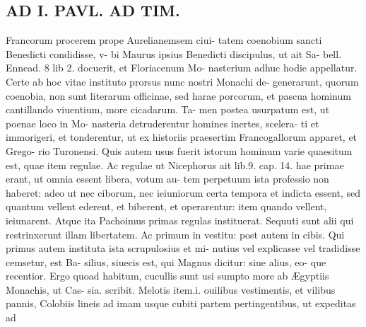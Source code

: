 \documentclass{article}
\begin{document}
\begin{pages}
\section*{AD I. PAVL. AD TIM. }
\marginpar{[ p.220 ]}Francorum procerem prope Aurelianemsem ciui- tatem coenobium sancti Benedicti condidisse, v- bi Maurus ipsius Benedicti discipulus, ut ait Sa- bell. Ennead. 8 lib 2. docuerit, et Floriacenum Mo- nasterium adhuc hodie appellatur. Certe ab hoc vitae instituto prorsus nunc nostri Monachi de- generarunt, quorum coenobia, non sunt literarum officinae, sed harae porcorum, et pascua hominum cantillando viuentium, more cicadarum. Ta- men postea usurpatum est, ut poenae loco in Mo- nasteria detruderentur homines inertes, scelera- ti et immorigeri, et tonderentur, ut ex historiis praesertim Francogallorum apparet, et Grego- rio Turonensi. Quis autem usus fuerit istorum hominum varie quaesitum est, quae item regulae. Ac regulae ut Nicephorus ait lib.9. cap. 14. hae primae erant, ut omnia essent libera, votum au- tem perpetuum ista professio non haberet: adeo ut nec ciborum, nec ieiuniorum certa tempora et indicta essent, sed quantum vellent ederent, et biberent, et operarentur: item quando vellent, ieiunarent. Atque ita Pachoimus primas regulas instituerat. Sequuti sunt alii qui restrinxerunt illam libertatem. Ac primum in vestitu: post autem in cibis. Qui primus autem instituta ista scrupulosius et mi- nutius vel explicasse vel tradidisse cemsetur, est Ba- silius, siuecis est, qui Magnus dicitur: siue alius, eo- que recentior. Ergo quoad habitum, cucullis sunt usi sumpto more ab Ægyptiis Monachis, ut Cas- sia. scribit. Melotis item.i. ouilibus vestimentis, et vilibus pannis, Colobiis lineis ad imam usque cubiti partem pertingentibus, ut expeditas ad 

\end{pages}
\end{document}
